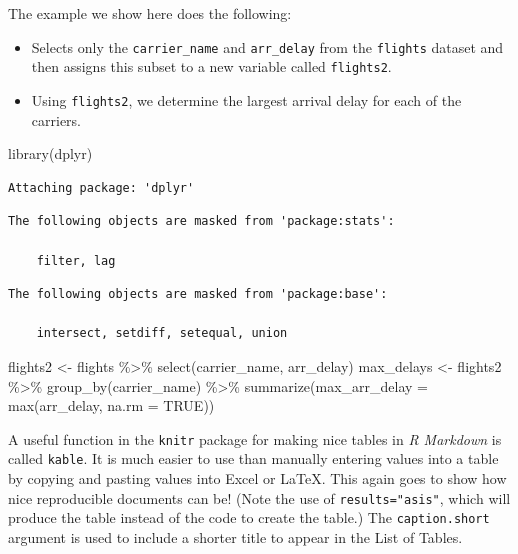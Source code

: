 \documentclass [11pt, proquest] {uwthesis}[2015/03/03]
\newenvironment{Shaded}{\begin{snugshade}}{\end{snugshade}}
\newcommand{\AttributeTok}[1]{\textcolor[rgb]{0.77,0.63,0.00}{#1}}
\newcommand{\ConstantTok}[1]{\textcolor[rgb]{0.00,0.00,0.00}{#1}}
\newcommand{\FunctionTok}[1]{\textcolor[rgb]{0.00,0.00,0.00}{#1}}
\newcommand{\NormalTok}[1]{#1}
\newcommand{\OtherTok}[1]{\textcolor[rgb]{0.56,0.35,0.01}{#1}}
\newcommand{\SpecialCharTok}[1]{\textcolor[rgb]{0.00,0.00,0.00}{#1}}
\begin{document}
The example we show here does the following:
\begin{itemize}
\item
  Selects only the \texttt{carrier\_name} and \texttt{arr\_delay} from the \texttt{flights} dataset and then assigns this subset to a new variable called \texttt{flights2}.
\item
  Using \texttt{flights2}, we determine the largest arrival delay for each of the carriers.
\end{itemize}
\begin{Shaded}
\begin{Highlighting}[]
\FunctionTok{library}\NormalTok{(dplyr)}
\end{Highlighting}
\end{Shaded}
\begin{verbatim}
Attaching package: 'dplyr'
\end{verbatim}
\begin{verbatim}
The following objects are masked from 'package:stats':

    filter, lag
\end{verbatim}
\begin{verbatim}
The following objects are masked from 'package:base':

    intersect, setdiff, setequal, union
\end{verbatim}
\begin{Shaded}
\begin{Highlighting}[]
\NormalTok{flights2 }\OtherTok{\textless{}{-}}\NormalTok{ flights }\SpecialCharTok{\%\textgreater{}\%} 
  \FunctionTok{select}\NormalTok{(carrier\_name, arr\_delay)}
\NormalTok{max\_delays }\OtherTok{\textless{}{-}}\NormalTok{ flights2 }\SpecialCharTok{\%\textgreater{}\%} 
  \FunctionTok{group\_by}\NormalTok{(carrier\_name) }\SpecialCharTok{\%\textgreater{}\%}
  \FunctionTok{summarize}\NormalTok{(}\AttributeTok{max\_arr\_delay =} \FunctionTok{max}\NormalTok{(arr\_delay, }\AttributeTok{na.rm =} \ConstantTok{TRUE}\NormalTok{))}
\end{Highlighting}
\end{Shaded}
A useful function in the \texttt{knitr} package for making nice tables in \emph{R Markdown} is called \texttt{kable}. It is much easier to use than manually entering values into a table by copying and pasting values into Excel or LaTeX. This again goes to show how nice reproducible documents can be! (Note the use of \texttt{results="asis"}, which will produce the table instead of the code to create the table.) The \texttt{caption.short} argument is used to include a shorter title to appear in the List of Tables.
\end{document}
